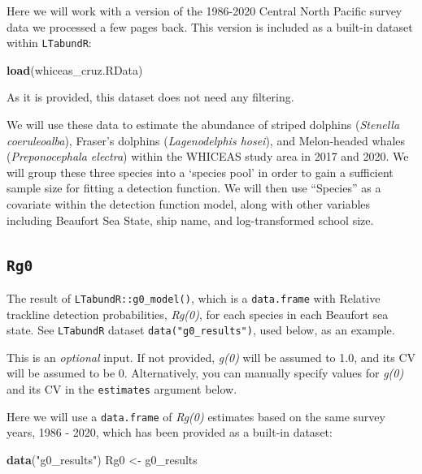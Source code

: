 \documentclass[
]{book}
\newenvironment{Shaded}{\begin{snugshade}}{\end{snugshade}}
\newcommand{\FunctionTok}[1]{\textcolor[rgb]{0.13,0.29,0.53}{\textbf{#1}}}
\newcommand{\NormalTok}[1]{#1}
\newcommand{\OtherTok}[1]{\textcolor[rgb]{0.56,0.35,0.01}{#1}}
\newcommand{\StringTok}[1]{\textcolor[rgb]{0.31,0.60,0.02}{#1}}
\begin{document}
Here we will work with a version of the 1986-2020 Central North Pacific survey data we processed a few pages back. This version is included as a built-in dataset within \texttt{LTabundR}:

\begin{Shaded}
\begin{Highlighting}[]
\FunctionTok{load}\NormalTok{(}\StringTok{\textquotesingle{}whiceas\_cruz.RData\textquotesingle{}}\NormalTok{)}
\end{Highlighting}
\end{Shaded}

As it is provided, this dataset does not need any filtering.

We will use these data to estimate the abundance of striped dolphins (\emph{Stenella coeruleoalba}), Fraser's dolphins (\emph{Lagenodelphis hosei}), and Melon-headed whales (\emph{Preponocephala electra}) within the WHICEAS study area in 2017 and 2020. We will group these three species into a `species pool' in order to gain a sufficient sample size for fitting a detection function. We will then use ``Species'' as a covariate within the detection function model, along with other variables including Beaufort Sea State, ship name, and log-transformed school size.

\hypertarget{rg0}{%
\subsection*{\texorpdfstring{\texttt{Rg0}}{Rg0}}\label{rg0}}

The result of \texttt{LTabundR::g0\_model()}, which is a \texttt{data.frame} with Relative trackline detection probabilities, \emph{Rg(0)}, for each species in each Beaufort sea state. See \texttt{LTabundR} dataset \texttt{data("g0\_results")}, used below, as an example.

This is an \emph{optional} input. If not provided, \emph{g(0)} will be assumed to 1.0, and its CV will be assumed to be 0. Alternatively, you can manually specify values for \emph{g(0)} and its CV in the \texttt{estimates} argument below.

Here we will use a \texttt{data.frame} of \emph{Rg(0)} estimates based on the same survey years, 1986 - 2020, which has been provided as a built-in dataset:

\begin{Shaded}
\begin{Highlighting}[]
\FunctionTok{data}\NormalTok{(}\StringTok{"g0\_results"}\NormalTok{)}
\NormalTok{Rg0 }\OtherTok{\textless{}{-}}\NormalTok{ g0\_results}
\end{Highlighting}
\end{Shaded}
\end{document}
